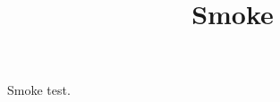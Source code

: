\documentclass[conference]{IEEEtran}
\begin{document}
\title{Smoke}
\author{}
\maketitle
Smoke test.
\end{document}
